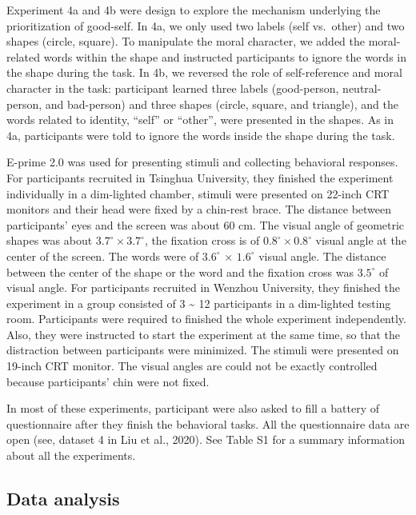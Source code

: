 \documentclass[
  man]{apa6}
\begin{document}
Experiment 4a and 4b were design to explore the mechanism underlying the prioritization of good-self. In 4a, we only used two labels (self vs.~other) and two shapes (circle, square). To manipulate the moral character, we added the moral-related words within the shape and instructed participants to ignore the words in the shape during the task. In 4b, we reversed the role of self-reference and moral character in the task: participant learned three labels (good-person, neutral-person, and bad-person) and three shapes (circle, square, and triangle), and the words related to identity, ``self'' or ``other'', were presented in the shapes. As in 4a, participants were told to ignore the words inside the shape during the task.

E-prime 2.0 was used for presenting stimuli and collecting behavioral responses. For participants recruited in Tsinghua University, they finished the experiment individually in a dim-lighted chamber, stimuli were presented on 22-inch CRT monitors and their head were fixed by a chin-rest brace. The distance between participants' eyes and the screen was about 60 cm. The visual angle of geometric shapes was about \(3.7^\circ × 3.7^\circ\), the fixation cross is of \(0.8^\circ × 0.8^\circ\) visual angle at the center of the screen. The words were of \(3.6^\circ\) × \(1.6^\circ\) visual angle. The distance between the center of the shape or the word and the fixation cross was \(3.5^\circ\) of visual angle. For participants recruited in Wenzhou University, they finished the experiment in a group consisted of 3 \textasciitilde{} 12 participants in a dim-lighted testing room. Participants were required to finished the whole experiment independently. Also, they were instructed to start the experiment at the same time, so that the distraction between participants were minimized. The stimuli were presented on 19-inch CRT monitor. The visual angles are could not be exactly controlled because participants' chin were not fixed.

In most of these experiments, participant were also asked to fill a battery of questionnaire after they finish the behavioral tasks. All the questionnaire data are open (see, dataset 4 in Liu et al., 2020). See Table S1 for a summary information about all the experiments.

\hypertarget{data-analysis}{%
\subsection{Data analysis}\label{data-analysis}}
\end{document}
